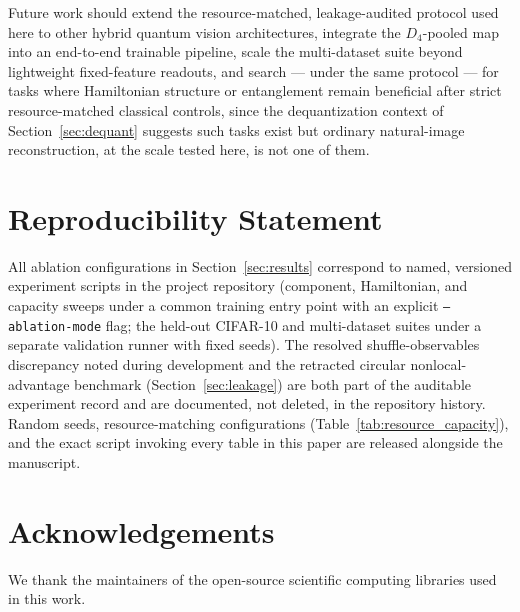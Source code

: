 \documentclass[journal]{IEEEtran}
\begin{document}
Future work should extend the resource-matched, leakage-audited protocol used here to other hybrid quantum vision architectures, integrate the $D_4$-pooled map into an end-to-end trainable pipeline, scale the multi-dataset suite beyond lightweight fixed-feature readouts, and search --- under the same protocol --- for tasks where Hamiltonian structure or entanglement remain beneficial after strict resource-matched classical controls, since the dequantization context of Section~\ref{sec:dequant} suggests such tasks exist but ordinary natural-image reconstruction, at the scale tested here, is not one of them.

\section*{Reproducibility Statement}
All ablation configurations in Section~\ref{sec:results} correspond to named, versioned experiment scripts in the project repository (component, Hamiltonian, and capacity sweeps under a common training entry point with an explicit \texttt{--ablation-mode} flag; the held-out CIFAR-10 and multi-dataset suites under a separate validation runner with fixed seeds). The resolved shuffle-observables discrepancy noted during development and the retracted circular nonlocal-advantage benchmark (Section~\ref{sec:leakage}) are both part of the auditable experiment record and are documented, not deleted, in the repository history. Random seeds, resource-matching configurations (Table~\ref{tab:resource_capacity}), and the exact script invoking every table in this paper are released alongside the manuscript.

\section*{Acknowledgements}
We thank the maintainers of the open-source scientific computing libraries used in this work.

\appendix
\end{document}
